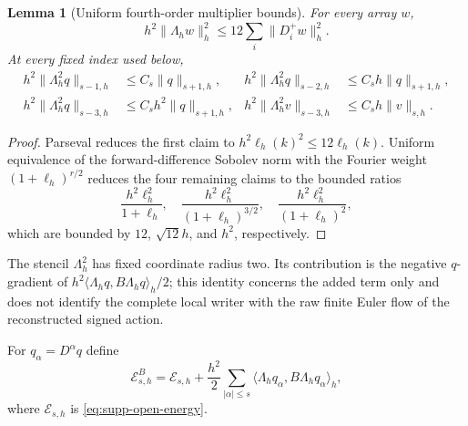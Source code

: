 \documentclass[11pt]{article}
\numberwithin{equation}{section}
\newtheorem{lemma}[lemma]{Lemma}
\theoremstyle{definition}
\theoremstyle{remark}
\begin{document}
\begin{lemma}[Uniform fourth-order multiplier bounds]
\label{lem:supp-law-multiplier}
For every array $w$,
\begin{equation}
 h^2\|\Lambda_hw\|_h^2\le12\sum_i\|D_i^+w\|_h^2.
 \label{eq:supp-law-domination}
\end{equation}
At every fixed index used below,
\begin{align}
 h^2\|\Lambda_h^2q\|_{s-1,h}&\le C_s\|q\|_{s+1,h},&
 h^2\|\Lambda_h^2q\|_{s-2,h}&\le C_sh\|q\|_{s+1,h},\\
 h^2\|\Lambda_h^2q\|_{s-3,h}&\le C_sh^2\|q\|_{s+1,h},&
 h^2\|\Lambda_h^2v\|_{s-3,h}&\le C_sh\|v\|_{s,h}.
 \label{eq:supp-law-orders}
\end{align}
\end{lemma}
\begin{proof}
Parseval reduces the first claim to
$h^2\ell_h(k)^2\le12\ell_h(k)$.  Uniform equivalence of the forward-difference
Sobolev norm with the Fourier weight $(1+\ell_h)^{r/2}$ reduces the four
remaining claims to the bounded ratios
\[
 \frac{h^2\ell_h^2}{1+\ell_h},\quad
 \frac{h^2\ell_h^2}{(1+\ell_h)^{3/2}},\quad
 \frac{h^2\ell_h^2}{(1+\ell_h)^2},
\]
which are bounded by $12$, $\sqrt{12}h$, and $h^2$, respectively.
\end{proof}

The stencil $\Lambda_h^2$ has fixed coordinate radius two.  Its contribution
is the negative $q$-gradient of
$h^2\langle\Lambda_hq,B\Lambda_hq\rangle_h/2$; this identity concerns the
added term only and does not identify the complete local writer with the raw
finite Euler flow of the reconstructed signed action.

For $q_\alpha=D^\alpha q$ define
\begin{equation}
 \mathscr E^B_{s,h}=\mathscr E_{s,h}
   +\frac{h^2}{2}\sum_{|\alpha|\le s}
       \langle\Lambda_hq_\alpha,B\Lambda_hq_\alpha\rangle_h,
 \label{eq:supp-law-energy}
\end{equation}
where $\mathscr E_{s,h}$ is \eqref{eq:supp-open-energy}.
\end{document}
